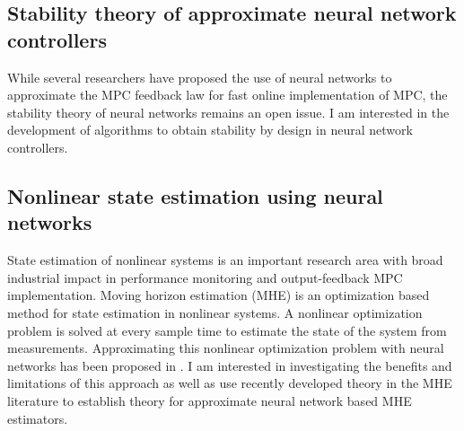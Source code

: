 \documentclass[11pt, a4paper]{article} %
\begin{document}
%

\subsection*{Stability theory of approximate neural network controllers}

While several researchers have proposed the use of neural networks to 
approximate the MPC feedback law for fast online implementation of MPC, the 
stability theory of neural networks remains an open issue. I am interested in 
the development of algorithms to obtain stability by design in neural network 
controllers. 

\subsection*{Nonlinear state estimation using neural networks}

State estimation of nonlinear systems is an important research area with broad 
industrial impact in performance monitoring and output-feedback MPC 
implementation. Moving horizon estimation (MHE) is an optimization based method 
for state estimation in nonlinear systems. A nonlinear optimization problem is 
solved at every sample time to estimate the state of the system from 
measurements. Approximating this nonlinear optimization problem with neural 
networks has been proposed in . I am interested in investigating the benefits 
and limitations of this approach as well as use recently developed theory in 
the MHE literature to establish theory for approximate neural network based MHE 
estimators.
\end{document}

